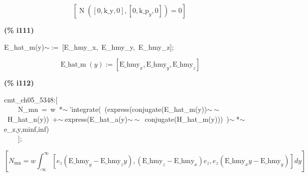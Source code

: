 \documentclass[fleqn]{article}
\begin{document}
\[\tag{\% o110} 
\left[ \operatorname{N}\left( \left[ 0\operatorname{,}\ensuremath{\mathrm{k\_ y}}\operatorname{,}0\right] \operatorname{,}\left[ 0\operatorname{,}{{\ensuremath{\mathrm{k\_ p}}}_y}\operatorname{,}0\right] \right) =0\right] \mbox{}
\]


\noindent
\begin{minipage}[t]{4.000000em}\color{red}\bfseries
(\% i111)	
\end{minipage}
\begin{minipage}[t]{\textwidth}\color{blue}
E\_hat\_m(y)\ensuremath{\sim\ }:=\ [E\_hmy\_x,\ E\_hmy\_y,\ E\_hmy\_z];
\end{minipage}
\[\displaystyle \tag{\% o111} 
\operatorname{E\_ hat\_ m}(y)\operatorname{:=}\left[ {{\ensuremath{\mathrm{E\_ hmy}}}_x}\operatorname{,}{{\ensuremath{\mathrm{E\_ hmy}}}_y}\operatorname{,}{{\ensuremath{\mathrm{E\_ hmy}}}_z}\right] \mbox{}
\]


\noindent
\begin{minipage}[t]{4.000000em}\color{red}\bfseries
(\% i112)	
\end{minipage}
\begin{minipage}[t]{\textwidth}\color{blue}
cmt\_ch05\_5348:[\\
\ \ \ \ N\_mn\ =\ w\ *\ensuremath{\sim\ }'integrate(\ (express(conjugate(E\_hat\_m(y))\ensuremath{\sim\ }\ensuremath{\sim\ }\ H\_hat\_n(y))\ +\ensuremath{\sim\ }express(E\_hat\_a(y)\ensuremath{\sim\ }\ensuremath{\sim\ }\ conjugate(H\_hat\_m(y)))\ )\ensuremath{\sim\ }*\ensuremath{\sim\ }e\_z,y,minf,inf)\\
\ \ \ \ ];
\end{minipage}
\[\displaystyle \tag{\% o112} 
\left[ {N_{\ensuremath{\mathrm{mn}}}}=w \int_{\operatorname{-}\infty }^{\infty }{\left. \left[ {e_z} \left( {{\ensuremath{\mathrm{E\_ hmy}}}_y}-{{\ensuremath{\mathrm{E\_ hmy}}}_z} y\right) \operatorname{,}\left( {{\ensuremath{\mathrm{E\_ hmy}}}_z}-{{\ensuremath{\mathrm{E\_ hmy}}}_x}\right)  {e_z}\operatorname{,}{e_z} \left( {{\ensuremath{\mathrm{E\_ hmy}}}_x} y-{{\ensuremath{\mathrm{E\_ hmy}}}_y}\right) \right] dy\right.}\right] \mbox{}
\]
\end{document}
